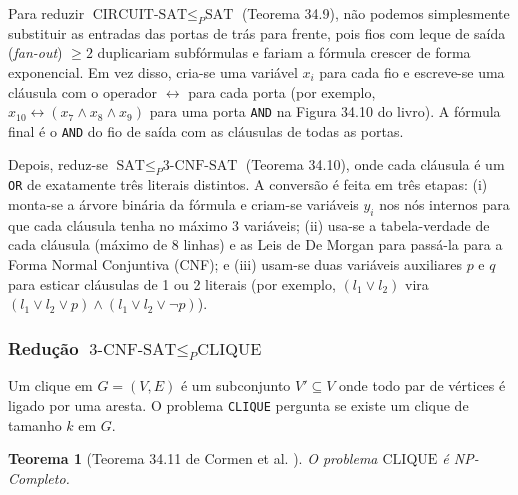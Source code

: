 \documentclass[conference]{IEEEtran}
\theoremstyle{definition}
\theoremstyle{plain}
\newtheorem{teorema}{Teorema}
\begin{document}
Para reduzir $\text{CIRCUIT-SAT} \le_P \text{SAT}$ (Teorema 34.9), não podemos simplesmente substituir as entradas das portas de trás para frente, pois fios com leque de saída (\textit{fan-out}) $\ge 2$ duplicariam subfórmulas e fariam a fórmula crescer de forma exponencial. Em vez disso, cria-se uma variável $x_i$ para cada fio e escreve-se uma cláusula com o operador $\leftrightarrow$ para cada porta (por exemplo, $x_{10} \leftrightarrow (x_7 \land x_8 \land x_9)$ para uma porta \texttt{AND} na Figura 34.10 do livro). A fórmula final é o \texttt{AND} do fio de saída com as cláusulas de todas as portas.

Depois, reduz-se $\text{SAT} \le_P \text{3-CNF-SAT}$ (Teorema 34.10), onde cada cláusula é um \texttt{OR} de exatamente três literais distintos. A conversão é feita em três etapas: (i) monta-se a árvore binária da fórmula e criam-se variáveis $y_i$ nos nós internos para que cada cláusula tenha no máximo 3 variáveis; (ii) usa-se a tabela-verdade de cada cláusula (máximo de $8$ linhas) e as Leis de De Morgan para passá-la para a Forma Normal Conjuntiva (CNF); e (iii) usam-se duas variáveis auxiliares $p$ e $q$ para esticar cláusulas de 1 ou 2 literais (por exemplo, $(l_1 \lor l_2)$ vira $(l_1 \lor l_2 \lor p) \land (l_1 \lor l_2 \lor \neg p)$).

\subsubsection{Redução $\text{3-CNF-SAT} \le_P \text{CLIQUE}$}

Um clique em $G = (V, E)$ é um subconjunto $V' \subseteq V$ onde todo par de vértices é ligado por uma aresta. O problema \texttt{CLIQUE} pergunta se existe um clique de tamanho $k$ em $G$.

\begin{teorema}[Teorema 34.11 de Cormen et al. \cite{cormen2012algoritmos}]
O problema $\text{CLIQUE}$ é NP-Completo.
\end{teorema}
\end{document}
